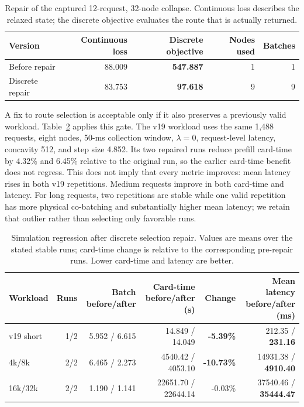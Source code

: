 \documentclass[10pt]{article}
\newcommand{\keydata}[1]{\textcolor{green!40!black}{\textbf{#1}}}
\newcommand{\alertdata}[1]{\textcolor{red!70!black}{\textbf{#1}}}
\begin{document}
\begin{table}[t]
\centering
\caption{Repair of the captured 12-request, 32-node collapse. Continuous
loss describes the relaxed state; the discrete objective evaluates the route
that is actually returned.}
\label{tab:discrete-collapse-repair}
\small
\begin{tabular}{lrrrr}
\toprule
Version & Continuous loss & Discrete objective & Nodes used & Batches \\
\midrule
Before repair & 88.009 & \alertdata{547.887} & 1 & 1 \\
Discrete repair & 83.753 & \keydata{97.618} & 9 & 9 \\
\bottomrule
\end{tabular}
\end{table}

A fix to route selection is acceptable only if it also preserves a previously
valid workload. Table~\ref{tab:discrete-repair-regression} applies this gate.
The v19 workload uses the same 1,488 requests, eight nodes, 50-ms collection
window, $\lambda=0$, request-level latency, concavity 512, and step size
4.852. Its two repaired runs reduce prefill card-time by 4.32\% and 6.45\%
relative to the original run, so the earlier card-time benefit does not
regress. This does not imply that every metric improves: mean latency rises in
both v19 repetitions. Medium requests improve in both card-time and latency.
For long requests, two repetitions are stable while one valid repetition has
more physical co-batching and substantially higher mean latency; we retain
that outlier rather than selecting only favorable runs.

\begin{table}[t]
\centering
\caption{Simulation regression after discrete selection repair. Values are
means over the stated stable runs; card-time change is relative to the
corresponding pre-repair runs. Lower card-time and latency are better.}
\label{tab:discrete-repair-regression}
\small
\begin{tabular}{lrrrrr}
\toprule
Workload & Runs & Batch before/after & Card-time before/after (s) & Change & Mean latency before/after (ms) \\
\midrule
v19 short & 1/2 & 5.952 / 6.615 & 14.849 / 14.049 & \keydata{-5.39\%} & 212.35 / \alertdata{231.16} \\
4k/8k & 2/2 & 6.465 / 2.273 & 4540.42 / 4053.10 & \keydata{-10.73\%} & 14931.38 / \keydata{4910.40} \\
16k/32k & 2/2 & 1.190 / 1.141 & 22651.70 / 22644.14 & -0.03\% & 37540.46 / \keydata{35444.47} \\
\bottomrule
\end{tabular}
\end{table}
\end{document}
